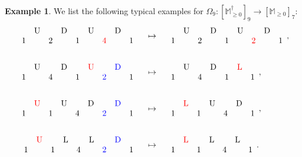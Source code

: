 \documentclass[12pt,reqno]{amsart}
\numberwithin{equation}{section}
\theoremstyle{theorem}
\theoremstyle{definition}
\newtheorem{example}[theorem]{Example}
\theoremstyle{named}
\newcommand{\bbM}{\mathbb{M}}
\newcommand{\rU}{\mathrm{U}}
\newcommand{\rD}{\mathrm{D}}
\newcommand{\rL}{\mathrm{L}}
\begin{document}
\begin{example}
	We list the following typical examples for $\Omega_9 : [\bbM_{\ge 0}^\dagger]_9 \to [\bbM_{\ge 0}]_{7}$:
	\begin{align*}
		\begin{array}{ccccccccc}
			& \rU & & \rD & & \rU & & \rD\\
			1 & & 2 & & 1 & & {\color{red}4} & & 1
		\end{array} & \quad\mapsto\quad \begin{array}{ccccccccc}
			& \rU & & \rD & & \rU & & \rD\\
			1 & & 2 & & 1 & & {\color{red}2} & & 1
		\end{array},\\
		\\
		\begin{array}{ccccccccc}
			& \rU & & \rD & & {\color{red}\rU} & & {\color{blue}\rD}\\
			1 & & 4 & & 1 & & {\color{blue}2} & & 1
		\end{array} & \quad\mapsto\quad \begin{array}{ccccccc}
			& \rU & & \rD & & {\color{red}\rL}\\
			1 & & 4 & & 1 & & 1
		\end{array},\\
		\\
		\begin{array}{ccccccccc}
			& {\color{red}\rU} & & \rU & & \rD & & {\color{blue}\rD}\\
			1 & & 1 & & 4 & & {\color{blue}2} & & 1
		\end{array} & \quad\mapsto\quad \begin{array}{ccccccc}
			& {\color{red}\rL} & & \rU & & \rD\\
			1 & & 1 & & 4 & & 1
		\end{array},\\
		\\
		\begin{array}{ccccccccc}
			& {\color{red}\rU} & & \rL & & \rL & & {\color{blue}\rD}\\
			1 & & 1 & & 4 & & {\color{blue}2} & & 1
		\end{array} & \quad\mapsto\quad \begin{array}{ccccccc}
			& {\color{red}\rL} & & \rL & & \rL\\
			1 & & 1 & & 4 & & 1
		\end{array}.
	\end{align*}
\end{example}
\end{document}
